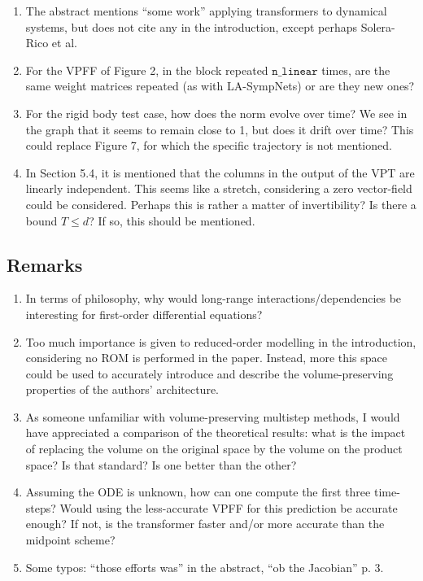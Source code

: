 \documentclass{article}
\begin{document}
\begin{enumerate}
    \item The abstract mentions ``some work'' applying transformers to dynamical systems, but does not cite any in the introduction, except perhaps Solera-Rico et al.
    \item For the VPFF of Figure 2, in the block repeated $\mathtt{n\_linear}$ times, are the same weight matrices repeated (as with LA-SympNets) or are they new ones?
    \item For the rigid body test case, how does the norm evolve over time? We see in the graph that it seems to remain close to 1, but does it drift over time? This could replace Figure 7, for which the specific trajectory is not mentioned.
    \item In Section 5.4, it is mentioned that the columns in the output of the VPT are linearly independent. This seems like a stretch, considering a zero vector-field could be considered. Perhaps this is rather a matter of invertibility? Is there a bound $T\leq{}d$? If so, this should be mentioned.
\end{enumerate}


\subsection*{Remarks}

\begin{enumerate}
    \item In terms of philosophy, why would long-range interactions/dependencies be interesting for first-order differential equations?
    \item Too much importance is given to reduced-order modelling in the introduction, considering no ROM is performed in the paper. Instead, more this space could be used to accurately introduce and describe the volume-preserving properties of the authors' architecture.
    \item As someone unfamiliar with volume-preserving multistep methods, I would have appreciated a comparison of the theoretical results: what is the impact of replacing the volume on the original space by the volume on the product space? Is that standard? Is one better than the other?
    \item Assuming the ODE is unknown, how can one compute the first three time-steps? Would using the less-accurate VPFF for this prediction be accurate enough? If not, is the transformer faster and/or more accurate than the midpoint scheme?
    \item Some typos: ``those efforts was'' in the abstract, ``ob the Jacobian'' p. 3.
\end{enumerate}
\end{document}
